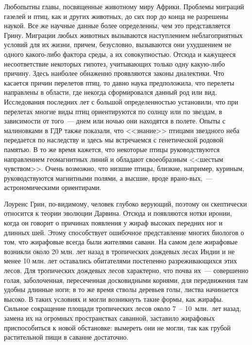 \documentclass[12pt,a4paper,twoside,openany,svgnames]{memoir}
\begin{document}
Любопытны главы, посвященные животному миру Африки. Проблемы миграций газелей и птиц, как и других животных, до сих пор до конца не разрешены наукой. Все же научные данные более определенны, чем это представляется Грину. Миграции любых животных вызываются наступлением неблагоприятных условий для их жизни, причем, безусловно, вызываются они ухудшением не одного какого-либо фактора среды, а их совокупностью. Отсюда и кажущееся несоответствие некоторых гипотез, учитывающих только одну какую-либо причину. Здесь наиболее обнаженно проявляются законы диалектики. Что касается причин перелетов птиц, то давно наука предположила, что перелеты направлены в области, где некогда сформировался данный род или вид. Исследования последних лет с большой определенностью установили, что при перелетах многие виды птиц ориентируются по солнцу или по звездам, в зависимости от того~--- днем или ночью они находятся в полете. Опыты с малиновками в ГДР также показали, что <<знание>> птицами звездного неба передается по наследству и здесь мы встречаемся с генетической родовой памятью. В то же время кажется, что некоторые птицы руководствуются направлением геомагнитных линий и обладают своеобразным <<шестым чувством>>. Очень возможно, что низшие птицы, близкие, например, куриным, руководствуются магнитными полями, а высшие, вроде врано-вых,~--- астрономическими ориентирами.

Лоуренс Грин, по-видимому, человек глубоко верующий, поэтому он скептически относится к теории эволюции Дарвина. Отсюда и появляются нотки иронии, когда он говорит о причинах появления у жираф высоких передних ног и длинных шей. Этому способствует ошибочное представление многих биологов о том, что жирафовые всегда были жителями саванн. На самом деле жирафовые возникли около 20 млн. лет назад в тропических дождевых лесах Индии и не менее 10 млн. лет оставались обитателями постепенно разреживающихся этих лесов. Для тропических дождевых лесов характерно, что почва их~--- совершенно голая, заболоченная, пересеченная досковидными корнями, для передвижения там удобны длинные ноги; в то же время стволы деревьев голы, листва начинается высоко. В таких условиях и могли возникнуть такие формы, как жирафы. Сильное сокращение площади тропических лесов около 7~-- 10~млн.~лет назад, замена их на огромных пространствах саванной, заставило жирафовых приспособиться к новой обстановке: вымереть они не могли, так как грубой растительной пищи в саванне достаточно.
\end{document}
